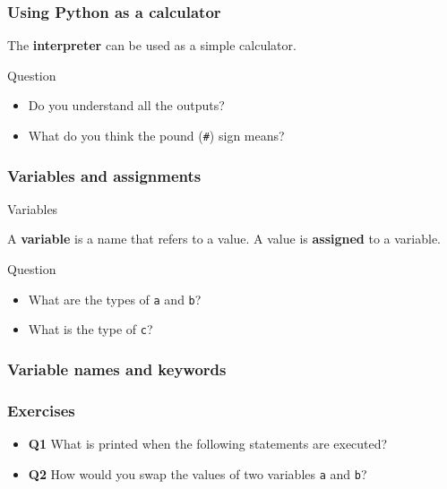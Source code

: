 \documentclass[xcolor=dvipsnames]{beamer}
\begin{document}
\begin{frame}
\frametitle{Using Python as a calculator}

The \textbf{interpreter} can be used as a simple calculator.

\vspace{1em}


\vspace{1em}
\begin{alertblock}{Question}
\begin{itemize}
\item Do you understand all the outputs?
\item What do you think the pound (\texttt{\#}) sign means?
\end{itemize}
\end{alertblock}

\end{frame}

\begin{frame}
\frametitle{Variables and assignments}
\begin{block}{Variables}

A \textbf{variable} is a name that refers to a value.
A value is \textbf{assigned} to a variable.
\end{block}
\vspace{1em}


\vspace{1em}
\begin{alertblock}{Question}
\begin{itemize}
\item What are the types of \texttt{a} and \texttt{b}?
\item What is the type of \texttt{c}?
\end{itemize}
\end{alertblock}
\end{frame}

\begin{frame}
\frametitle{Variable names and keywords}
\end{frame}

\begin{frame}
\frametitle{Exercises}
\begin{itemize}
\item \textbf{Q1} What is printed when the following statements are executed?

\item \textbf{Q2} How would you swap the values of two variables \texttt{a}
and \texttt{b}?
\end{itemize}
\end{frame}
\end{document}
